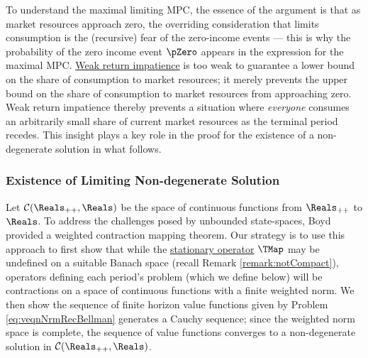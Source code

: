 \documentclass[BufferStockTheory]{subfiles}
\begin{document}

To understand the maximal limiting MPC, the essence of the argument is that as market resources approach zero, the overriding consideration that limits consumption is the (recursive) fear of the zero-income events --- this is why the probability of the zero income event $\pZero$ appears in the expression for the maximal MPC.
\hyperlink{WRIC}{Weak return impatience} is too weak to guarantee a lower bound on the share of consumption to market resources; it merely prevents the upper bound on the share of consumption to market resources from approaching zero.
Weak return impatience thereby prevents a situation where \textit{everyone} consumes an arbitrarily small share of current market resources as the terminal period recedes.
This insight plays a key role in the proof for the existence of a non-degenerate solution in what follows.



\begin{comment}
Next, define the `Value of Autarky Factor:'\hypertarget{VAFacDefn}{} 

$DiscFac \PermGroFac^{1-\CRRA}\Ex(\permShk^{1-\CRRA})$
\end{align}

\end{comment}


\hypertarget{Conditions-Under-Which-the-Problem-Defines-a-Contraction-Mapping}{}
\subsubsection{Existence of Limiting Non-degenerate Solution}\label{subsubsec:eventuallyCauchy}

Let $\mathcal{C}(\Reals_{++},\Reals)$ be the space of continuous functions from $\Reals_{++}$ to $\Reals$.
To address the challenges posed by unbounded state-spaces, Boyd~\citeyearpar{jboydWeighted} provided a weighted contraction mapping theorem.
Our strategy is to use this approach to first show that while the \hyperlink{Stationary-Bellman-Operator}{stationary operator} $\TMap$ may be undefined on a suitable Banach space (recall Remark \ref{remark:notCompact}), operators defining each period's problem (which we define below) will be contractions on a space of continuous functions with a finite weighted norm.
We then show the sequence of finite horizon value functions given by Problem \eqref{eq:veqnNrmRecBellman} generates a Cauchy sequence; since the weighted norm space is complete, the sequence of value functions converges to a non-degenerate solution in $\mathcal{C}(\Reals_{++},\Reals)$.
\end{document}
